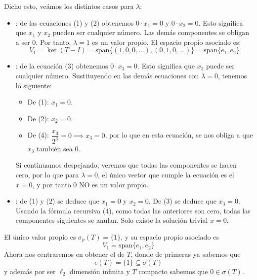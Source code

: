 \begin{ejercicio}
\begin{description}
        \noindent
        Dicho esto, veámos los distintos casos para $\lambda$:
        \begin{itemize}
            \item {}: de las ecuaciones (1) y (2) obtenemos $0 \cdot x_1 = 0$ y $0 \cdot x_2 = 0$. Esto significa que $x_1$ y $x_2$ pueden ser cualquier número. Las demás componentes se obligan a ser 0. Por tanto, $\lambda = 1$ es un valor propio. El espacio propio asociado es:
            $$V_1 = \ker(T - I) = \text{span}\{(1,0,0,\dots), (0,1,0,\dots)\} = \text{span}\{e_1, e_2\}$$
            \item {}: de la ecuación (3) obtenemos $0 \cdot x_3 = 0$. Esto significa que $x_3$ puede ser cualquier número. Sustituyendo en las demás ecuaciones con $\lambda = 0$, tenemos lo siguiente:
            \begin{itemize}
                \item De (1): $x_1 = 0$.
                \item De (2): $x_2 = 0$.
                \item De (4): $\dfrac{x_3}{2^3} = 0 \implies x_3 = 0$, por lo que en esta ecuación, se nos obliga a que $x_3$ también sea 0.
            \end{itemize}
            Si continuamos despejando, veremos que todas las componentes se hacen cero, por lo que  para $\lambda = 0$, el único vector que cumple la ecuación es el $x = 0$, y por tanto $0$ NO es un valor propio.
            \item {}: de (1) y (2) se deduce que $x_1 = 0$ y $x_2 = 0$. De (3) se deduce que $x_3 = 0$. Usando la fórmula recursiva (4), como todas las anteriores son cero, todas las componentes siguientes se anulan. Solo existe la solución trivial $x=0$.
        \end{itemize}
        El único valor propio es $\sigma_p(T) = \{1\}$, y su espacio propio asociado es 
        $$V_1 = \text{span}\{e_1, e_2\}$$
        Ahora nos centraremos en obtener el  de $T$, donde de primeras ya sabemos que 
        \begin{equation*}
            e(T) = \{1\} \subseteq \sigma(T)
        \end{equation*}
        y además por ser $\ell_2$ dimensión infinita y $T$ compacto sabemos que $0\in \sigma(T)$. \\


\end{description}
\end{ejercicio}
